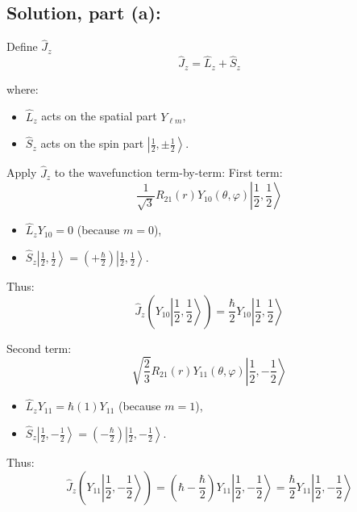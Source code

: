 \documentclass[12pt]{article}
\begin{document}
    \subsection{Solution, part (a):}
        Define $\hat{J}_z$
        \[
            \hat{J}_z = \hat{L}_z + \hat{S}_z
        \]

        where:
        \begin{itemize}
            \item \( \hat{L}_z \) acts on the spatial part \( Y_{\ell m} \),
            \item \( \hat{S}_z \) acts on the spin part \( \left| \frac{1}{2}, \pm \frac{1}{2} \right\rangle \).
        \end{itemize}

        Apply \( \hat{J}_z \) to the wavefunction term-by-term:
        First term:
        \[
            \frac{1}{\sqrt{3}} R_{21}(r) Y_{10}(\theta, \varphi) \left| \frac{1}{2}, \frac{1}{2} \right\rangle
        \]
        
        \begin{itemize}
            \item \( \hat{L}_z Y_{10} = 0 \) (because \( m=0 \)),
            \item \( \hat{S}_z \left| \frac{1}{2}, \frac{1}{2} \right\rangle = \left( +\frac{\hbar}{2} \right) \left| \frac{1}{2}, \frac{1}{2} \right\rangle \).
        \end{itemize}
        
        Thus:
        \[
            \hat{J}_z \left( Y_{10} \left| \frac{1}{2}, \frac{1}{2} \right\rangle \right) = \frac{\hbar}{2} Y_{10} \left| \frac{1}{2}, \frac{1}{2} \right\rangle
        \]

        Second term:
        \[
            \sqrt{\frac{2}{3}} R_{21}(r) Y_{11}(\theta, \varphi) \left| \frac{1}{2}, -\frac{1}{2} \right\rangle
        \]
        
        \begin{itemize}
            \item \( \hat{L}_z Y_{11} = \hbar (1) Y_{11} \) (because \( m=1 \)),
            \item \( \hat{S}_z \left| \frac{1}{2}, -\frac{1}{2} \right\rangle = \left( -\frac{\hbar}{2} \right) \left| \frac{1}{2}, -\frac{1}{2} \right\rangle \).
        \end{itemize}
        
        Thus:
        \[
            \hat{J}_z \left( Y_{11} \left| \frac{1}{2}, -\frac{1}{2} \right\rangle \right)
            = \left( \hbar - \frac{\hbar}{2} \right) Y_{11} \left| \frac{1}{2}, -\frac{1}{2} \right\rangle
            = \frac{\hbar}{2} Y_{11} \left| \frac{1}{2}, -\frac{1}{2} \right\rangle
        \]
        
\end{document}

